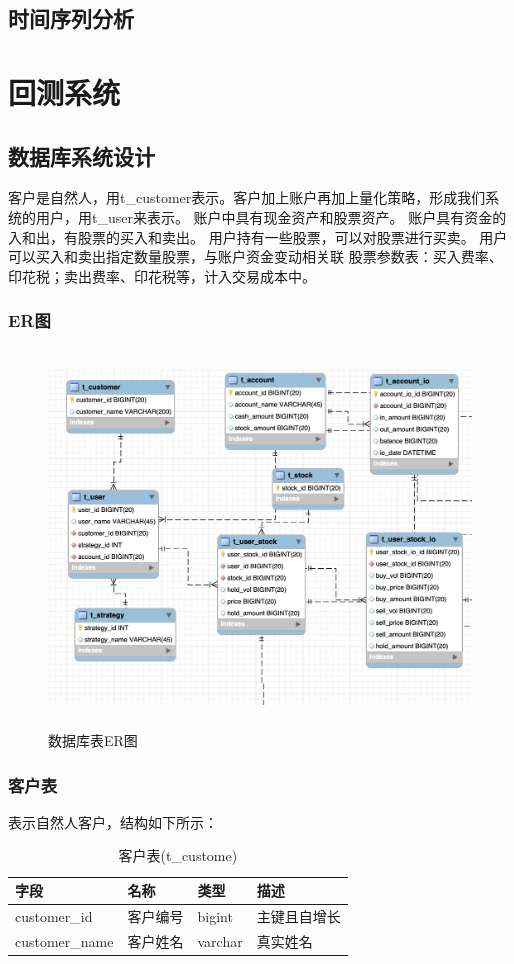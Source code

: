 \documentclass{article}
\begin{document}
\subsection{时间序列分析}
\section{回测系统}
\subsection{数据库系统设计}
客户是自然人，用t\_customer表示。客户加上账户再加上量化策略，形成我们系统的用户，用t\_user来表示。
账户中具有现金资产和股票资产。
账户具有资金的入和出，有股票的买入和卖出。
用户持有一些股票，可以对股票进行买卖。
用户可以买入和卖出指定数量股票，与账户资金变动相关联
股票参数表：买入费率、印花税；卖出费率、印花税等，计入交易成本中。
\subsubsection{ER图}
\begin{figure}[H]
	\caption{数据库表ER图}
	\label{f000001}
	\centering
	\includegraphics[height=10cm]{images/f000001}
\end{figure}
\subsubsection{客户表}
表示自然人客户，结构如下所示：
\begin{table}[h]
    \caption{客户表(t\_custome)}
    \label{t000001}
    \begin{tabular}{|p{2cm}|p{3cm}|p{2cm}|p{5cm}|} \hline
        字段 & 名称 & 类型 & 描述 \\ \hline 
        customer\_id & 客户编号 & bigint & 主键且自增长 \\ \hline
        customer\_name & 客户姓名 & varchar & 真实姓名 \\ \hline
    \end{tabular}
\end{table}
\end{document}
